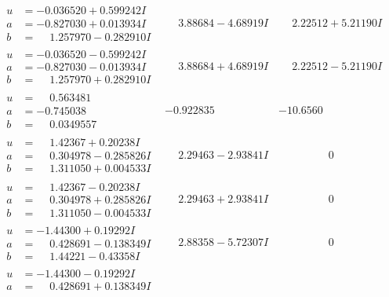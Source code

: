 \documentclass[1p]{elsarticle_modified}
\theoremstyle{definition}
\begin{document}
$$\begin{array}{c|c|c}
\begin{aligned}
u &= -0.036520 + 0.599242 I \\
a &= -0.827030 + 0.013934 I \\
b &= \phantom{-}1.257970 - 0.282910 I\end{aligned}
 & \phantom{-}3.88684 - 4.68919 I & \phantom{-}2.22512 + 5.21190 I \\ \hline\begin{aligned}
u &= -0.036520 - 0.599242 I \\
a &= -0.827030 - 0.013934 I \\
b &= \phantom{-}1.257970 + 0.282910 I\end{aligned}
 & \phantom{-}3.88684 + 4.68919 I & \phantom{-}2.22512 - 5.21190 I \\ \hline\begin{aligned}
u &= \phantom{-}0.563481\phantom{ +0.000000I} \\
a &= -0.745038\phantom{ +0.000000I} \\
b &= \phantom{-}0.0349557\phantom{ +0.000000I}\end{aligned}
 & -0.922835\phantom{ +0.000000I} & -10.6560\phantom{ +0.000000I} \\ \hline\begin{aligned}
u &= \phantom{-}1.42367 + 0.20238 I \\
a &= \phantom{-}0.304978 - 0.285826 I \\
b &= \phantom{-}1.311050 + 0.004533 I\end{aligned}
 & \phantom{-}2.29463 - 2.93841 I & \phantom{-0.000000 } 0 \\ \hline\begin{aligned}
u &= \phantom{-}1.42367 - 0.20238 I \\
a &= \phantom{-}0.304978 + 0.285826 I \\
b &= \phantom{-}1.311050 - 0.004533 I\end{aligned}
 & \phantom{-}2.29463 + 2.93841 I & \phantom{-0.000000 } 0 \\ \hline\begin{aligned}
u &= -1.44300 + 0.19292 I \\
a &= \phantom{-}0.428691 - 0.138349 I \\
b &= \phantom{-}1.44221 - 0.43358 I\end{aligned}
 & \phantom{-}2.88358 - 5.72307 I & \phantom{-0.000000 } 0 \\ \hline\begin{aligned}
u &= -1.44300 - 0.19292 I \\
a &= \phantom{-}0.428691 + 0.138349 I \\

\end{aligned}
\end{array}$$
\end{document}

